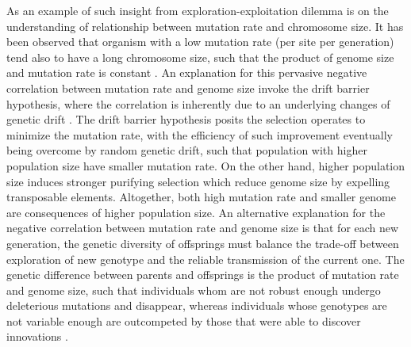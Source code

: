 As an example of such insight from exploration-exploitation dilemma is on the understanding of relationship between mutation rate and chromosome size.
It has been observed that organism with a low mutation rate (per site per generation) tend also to have a long chromosome size, such that the product of genome size and mutation rate is constant \cite{Drake1991}.
An explanation for this pervasive negative correlation between mutation rate and genome size invoke the drift barrier hypothesis, where the correlation is inherently due to an underlying changes of genetic drift \citep{Lynch2016a}.
The drift barrier hypothesis posits the selection operates to minimize the mutation rate, with the efficiency of such improvement eventually being overcome by random genetic drift, such that population with higher population size have smaller mutation rate. 
On the other hand, higher population size induces stronger purifying selection which reduce genome size by expelling transposable elements.
Altogether, both high mutation rate and smaller genome are consequences of higher population size.
An alternative explanation for the negative correlation between mutation rate and genome size is that for each new generation, the genetic diversity of offsprings must balance the trade-off between exploration of new genotype and the reliable transmission of the current one.
The genetic difference between parents and offsprings is the product of mutation rate and genome size, such that individuals whom are not robust enough undergo deleterious mutations and disappear, whereas individuals whose genotypes are not variable enough are outcompeted by those that were able to discover innovations \citep{Knibbe2007, Beslon2010, Hindre2012, Batut2014, Biller2016}.



